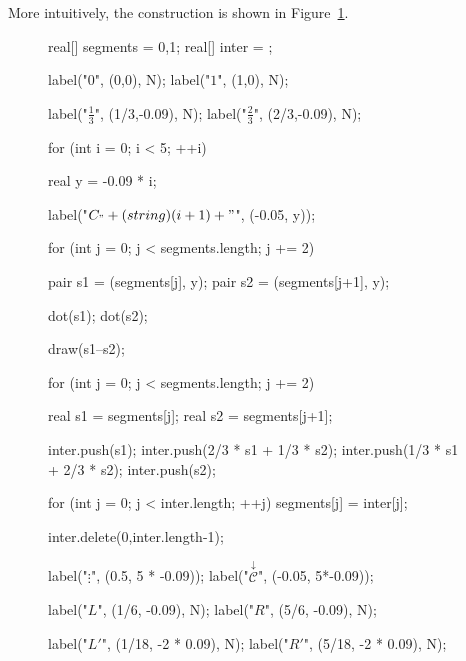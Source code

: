 \documentclass[../key.tex]{subfiles}
\begin{document}
\noindent More intuitively, the construction is shown in Figure~\ref{fig:construct_cantor}.
\begin{figure}[h]
	\begin{center}
		\begin{minipage}[b]{\textwidth}
			\centering
			\begin{asy}[width=0.7\textwidth]
			real[] segments = {0,1};
			real[] inter = {};
			
			label("$0$", (0,0), N);
			label("$1$", (1,0), N);
			
			label("$\frac{1}{3}$", (1/3,-0.09), N);
			label("$\frac{2}{3}$", (2/3,-0.09), N);
			
			for (int i = 0; i < 5; ++i) {
				real y = -0.09 * i;
			
				label("$C_" + (string) (i+1) + "$", (-0.05, y));
			
				for (int j = 0; j < segments.length; j += 2) {
					pair s1 = (segments[j], y);
					pair s2 = (segments[j+1], y);
			
					dot(s1);
					dot(s2);
			
					draw(s1--s2);
				}
			
				for (int j = 0; j < segments.length; j += 2) {
					real s1 = segments[j];
					real s2 = segments[j+1];
			
					inter.push(s1);
					inter.push(2/3 * s1 + 1/3 * s2);
					inter.push(1/3 * s1 + 2/3 * s2);
					inter.push(s2);
				}
			
				for (int j = 0; j < inter.length; ++j) {
					segments[j] = inter[j];
				}
			
				inter.delete(0,inter.length-1);
			}
			
			label("$\vdots$", (0.5, 5 * -0.09));
			label("$\stackrel{\downarrow}{\mathcal{C}}$", (-0.05, 5*-0.09));
			
			label("$L$", (1/6, -0.09), N);
			label("$R$", (5/6, -0.09), N);
			
			label("$L'$", (1/18, -2 * 0.09), N);
			label("$R'$", (5/18, -2 * 0.09), N);
			\end{asy}
		\end{minipage}
	\end{center}
	\vspace*{-2\baselineskip}
	\begin{center}
		\begin{minipage}[t]{\textwidth}
			\label{fig:construct_cantor}
		\end{minipage}
	\end{center}
	\vspace*{-2\baselineskip}
\end{figure}
\end{document}
